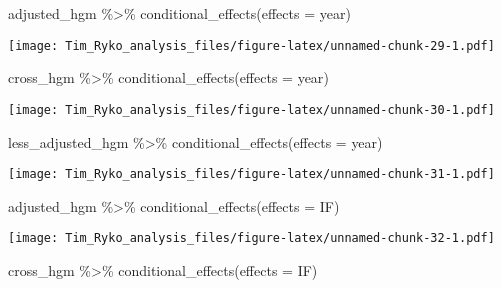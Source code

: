 \documentclass[
]{article}
\newenvironment{Shaded}{\begin{snugshade}}{\end{snugshade}}
\newcommand{\AttributeTok}[1]{\textcolor[rgb]{0.77,0.63,0.00}{#1}}
\newcommand{\FunctionTok}[1]{\textcolor[rgb]{0.00,0.00,0.00}{#1}}
\newcommand{\NormalTok}[1]{#1}
\newcommand{\SpecialCharTok}[1]{\textcolor[rgb]{0.00,0.00,0.00}{#1}}
\newcommand{\StringTok}[1]{\textcolor[rgb]{0.31,0.60,0.02}{#1}}
\begin{document}
\begin{Shaded}
\begin{Highlighting}[]
\NormalTok{adjusted\_hgm }\SpecialCharTok{\%\textgreater{}\%} \FunctionTok{conditional\_effects}\NormalTok{(}\AttributeTok{effects =} \StringTok{\textquotesingle{}year\textquotesingle{}}\NormalTok{)}
\end{Highlighting}
\end{Shaded}

\texttt{[image: Tim\_Ryko\_analysis\_files/figure-latex/unnamed-chunk-29-1.pdf]}

\begin{Shaded}
\begin{Highlighting}[]
\NormalTok{cross\_hgm }\SpecialCharTok{\%\textgreater{}\%} \FunctionTok{conditional\_effects}\NormalTok{(}\AttributeTok{effects =} \StringTok{\textquotesingle{}year\textquotesingle{}}\NormalTok{)}
\end{Highlighting}
\end{Shaded}

\texttt{[image: Tim\_Ryko\_analysis\_files/figure-latex/unnamed-chunk-30-1.pdf]}

\begin{Shaded}
\begin{Highlighting}[]
\NormalTok{less\_adjusted\_hgm }\SpecialCharTok{\%\textgreater{}\%} \FunctionTok{conditional\_effects}\NormalTok{(}\AttributeTok{effects =} \StringTok{\textquotesingle{}year\textquotesingle{}}\NormalTok{)}
\end{Highlighting}
\end{Shaded}

\texttt{[image: Tim\_Ryko\_analysis\_files/figure-latex/unnamed-chunk-31-1.pdf]}

\begin{Shaded}
\begin{Highlighting}[]
\NormalTok{adjusted\_hgm }\SpecialCharTok{\%\textgreater{}\%} \FunctionTok{conditional\_effects}\NormalTok{(}\AttributeTok{effects =} \StringTok{\textquotesingle{}IF\textquotesingle{}}\NormalTok{)}
\end{Highlighting}
\end{Shaded}

\texttt{[image: Tim\_Ryko\_analysis\_files/figure-latex/unnamed-chunk-32-1.pdf]}

\begin{Shaded}
\begin{Highlighting}[]
\NormalTok{cross\_hgm }\SpecialCharTok{\%\textgreater{}\%} \FunctionTok{conditional\_effects}\NormalTok{(}\AttributeTok{effects =} \StringTok{\textquotesingle{}IF\textquotesingle{}}\NormalTok{)}
\end{Highlighting}
\end{Shaded}
\end{document}
